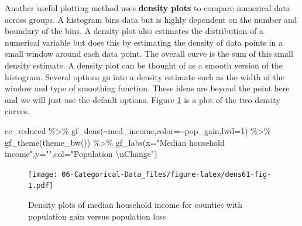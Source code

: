 \documentclass[
]{book}
\newenvironment{Shaded}{\begin{snugshade}}{\end{snugshade}}
\newcommand{\AttributeTok}[1]{\textcolor[rgb]{0.77,0.63,0.00}{#1}}
\newcommand{\DecValTok}[1]{\textcolor[rgb]{0.00,0.00,0.81}{#1}}
\newcommand{\FunctionTok}[1]{\textcolor[rgb]{0.00,0.00,0.00}{#1}}
\newcommand{\NormalTok}[1]{#1}
\newcommand{\SpecialCharTok}[1]{\textcolor[rgb]{0.00,0.00,0.00}{#1}}
\newcommand{\StringTok}[1]{\textcolor[rgb]{0.31,0.60,0.02}{#1}}
\begin{document}
Another useful plotting method uses \textbf{density plots} to compare numerical data across groups. A histogram bins data but is highly dependent on the number and boundary of the bins. A density plot also estimates the distribution of a numerical variable but does this by estimating the density of data points in a small window around each data point. The overall curve is the sum of this small density estimate. A density plot can be thought of as a smooth version of the histogram. Several options go into a density estimate such as the width of the window and type of smoothing function. These ideas are beyond the point here and we will just use the default options. Figure \ref{fig:dens61-fig} is a plot of the two density curves.

\begin{Shaded}
\begin{Highlighting}[]
\NormalTok{cc\_reduced }\SpecialCharTok{\%\textgreater{}\%}
  \FunctionTok{gf\_dens}\NormalTok{(}\SpecialCharTok{\textasciitilde{}}\NormalTok{med\_income,}\AttributeTok{color=}\SpecialCharTok{\textasciitilde{}}\NormalTok{pop\_gain,}\AttributeTok{lwd=}\DecValTok{1}\NormalTok{) }\SpecialCharTok{\%\textgreater{}\%}
  \FunctionTok{gf\_theme}\NormalTok{(}\FunctionTok{theme\_bw}\NormalTok{()) }\SpecialCharTok{\%\textgreater{}\%}
  \FunctionTok{gf\_labs}\NormalTok{(}\AttributeTok{x=}\StringTok{"Median household income"}\NormalTok{,}\AttributeTok{y=}\StringTok{""}\NormalTok{,}\AttributeTok{col=}\StringTok{"Population }\SpecialCharTok{\textbackslash{}n}\StringTok{Change"}\NormalTok{)}
\end{Highlighting}
\end{Shaded}

\begin{figure}
\centering
\texttt{[image: 06-Categorical-Data\_files/figure-latex/dens61-fig-1.pdf]}
\caption{\label{fig:dens61-fig}Density plots of median household income for counties with population gain versus population loss}
\end{figure}
\end{document}
